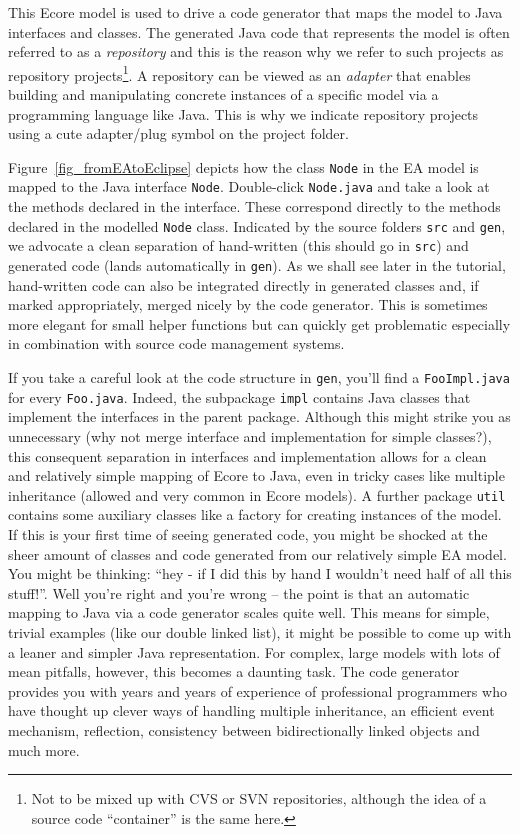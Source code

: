 This Ecore model is used to drive a code generator that maps the model to Java
interfaces and classes.  The generated Java code that represents the model is
often referred to as a \emph{repository} and this is the reason why we refer to
such projects as repository projects\footnote{Not to be mixed up with CVS or SVN
repositories, although the idea of a source code ``container'' is the same
here.}. A repository can be viewed as an \emph{adapter} that enables building and
manipulating concrete instances of a specific model via a programming language
like Java.  This is why we indicate repository projects using a cute
adapter/plug symbol on the project folder.  

Figure~\ref{fig_fromEAtoEclipse} depicts how the class \texttt{Node} in the EA
model is mapped to the Java interface \texttt{Node}.  Double-click
\texttt{Node.java} and take a look at the methods declared in the interface.
These correspond directly to the methods declared in the modelled \texttt{Node}
class.  Indicated by the source folders \texttt{src} and \texttt{gen}, we
advocate a clean separation of hand-written (this should go in \texttt{src}) and
generated code (lands automatically in \texttt{gen}).  As we shall see later in
the tutorial, hand-written code can also be integrated directly in generated
classes and, if marked appropriately, merged nicely by the code generator. 
This is sometimes more elegant for small helper functions but can quickly get
problematic especially in combination with source code management systems.

If you take a careful look at the code structure in \texttt{gen},
you'll find a \texttt{Foo\-Impl.java} for every \texttt{Foo.java}. Indeed, the 
subpackage \texttt{impl} contains Java classes that implement the interfaces in
the parent package.  Although this might strike you as unnecessary (why not
merge interface and implementation for simple classes?), this consequent
separation in interfaces and implementation allows for a clean and relatively
simple mapping of Ecore to Java, even in tricky cases like multiple inheritance
(allowed and very common in Ecore models).  A further package \texttt{util}
contains some auxiliary classes like a factory for creating instances of the
model.  If this is your first time of seeing generated code, you might be
shocked at the sheer amount of classes and code generated from our relatively
simple EA model.  You might be thinking: ``hey - if I did this by hand I
wouldn't need half of all this stuff!''.  Well you're right and you're wrong --
the point is that an automatic mapping to Java via a code generator scales quite
well.  This means for simple, trivial examples (like our double linked list), it
might be possible to come up with a leaner and simpler Java representation.  For
complex, large models with lots of mean pitfalls, however, this becomes a
daunting task.  The code generator provides you with years and years of
experience of professional programmers who have thought up clever ways
of handling multiple inheritance, an efficient event mechanism, reflection,
consistency between bidirectionally linked objects and much more.

